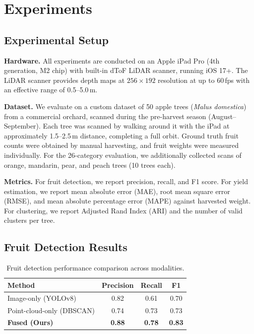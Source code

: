 \documentclass[article,final]{iclr2024_conference}
\begin{document}
\section{Experiments}
\label{sec:experiments}

\subsection{Experimental Setup}

\textbf{Hardware.}
All experiments are conducted on an Apple iPad Pro (4th generation, M2 chip) with built-in dToF LiDAR scanner, running iOS 17+. The LiDAR scanner provides depth maps at $256\times192$ resolution at up to 60\,fps with an effective range of 0.5--5.0\,m.

\textbf{Dataset.}
We evaluate on a custom dataset of 50 apple trees (\textit{Malus domestica}) from a commercial orchard, scanned during the pre-harvest season (August--September). Each tree was scanned by walking around it with the iPad at approximately 1.5--2.5\,m distance, completing a full orbit. Ground truth fruit counts were obtained by manual harvesting, and fruit weights were measured individually. For the 26-category evaluation, we additionally collected scans of orange, mandarin, pear, and peach trees (10 trees each).

\textbf{Metrics.}
For fruit detection, we report precision, recall, and F1 score. For yield estimation, we report mean absolute error (MAE), root mean square error (RMSE), and mean absolute percentage error (MAPE) against harvested weight. For clustering, we report Adjusted Rand Index (ARI) and the number of valid clusters per tree.

\subsection{Fruit Detection Results}

\begin{table}[t]
\centering
\caption{Fruit detection performance comparison across modalities.}
\label{tab:detection}
\begin{tabular}{lccc}
\toprule
Method & Precision & Recall & F1 \\
\midrule
Image-only (YOLOv8) & 0.82 & 0.61 & 0.70 \\
Point-cloud-only (DBSCAN) & 0.74 & 0.73 & 0.73 \\
\textbf{Fused (Ours)} & \textbf{0.88} & \textbf{0.78} & \textbf{0.83} \\
\bottomrule
\end{tabular}
\end{table}
\end{document}
